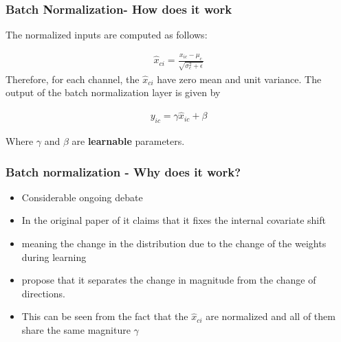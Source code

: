 \documentclass{beamer}
\begin{document}
\begin{frame}
    \frametitle{Batch Normalization- How does it work}
    The normalized inputs are computed as follows:
    
    \begin{align*}
    \hat{x}_{ci}=\frac{x_{ic}-\mu_c}{\sqrt{\sigma^2_c+\epsilon}}
    \end{align*}
Therefore, for each channel, the $\hat{x}_{ci}$ have zero mean and unit variance. The output of the batch normalization layer is given by
    
    \begin{align*}
    y_{ic}=\gamma \hat{x}_{ic}+\beta
    \end{align*}
    
    Where $\gamma$ and $\beta$ are \textbf{learnable} parameters.
    

\end{frame}
\begin{frame}
    \frametitle{Batch normalization - Why does it work?}
\begin{itemize}
    \item Considerable ongoing debate
\item In the original paper of \href{https://arxiv.org/abs/1502.03167}{} it claims that it fixes the internal covariate shift 
\item meaning the change in the distribution due to the change of the weights during learning 
\item \href{https://arxiv.org/abs/1805.10694v1}{} propose that it separates the change in magnitude from the change of directions.
\item This can be seen from the fact that the $\hat{x}_{ci}$ are normalized and all of them share the same magniture $\gamma$

\end{itemize}
    
\end{frame}
\end{document}
